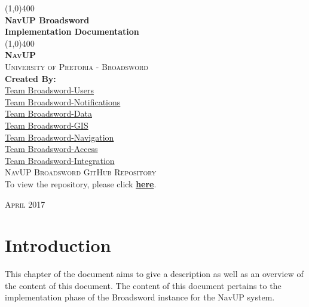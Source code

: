 \documentclass{article}
\begin{document}
	\begin{titlepage}
		\begin{center}

			\line(1,0){400}\\
			[6mm]
			\huge{
				\bfseries NavUP Broadsword\\
				\bfseries Implementation Documentation
			}\\
			[2mm]
			\line(1,0){400}\\
			[15mm]
			\textsc{\large{\textbf{NavUP}}}\\
			[4.5mm]
			\textsc{\large University of Pretoria - Broadsword}\\
			[20mm]
			\large{\textbf{Created By:}}\\
			[2mm]
			\large{
				\href{https://github.com/TheZimbo16/COS301-Broadsword-Users}{Team Broadsword-Users}\\
				\href{https://github.com/wanrick/bsword-notification}{Team Broadsword-Notifications}\\
				\href{https://github.com/lyle-univ/cos301-broadsword-data}{Team Broadsword-Data}\\
				\href{https://github.com/sjohandup/SE_BroadSword-GIS}{Team Broadsword-GIS}\\
				\href{https://github.com/AndriesJacobus/COS301Phase3BroadswordNavigation}{Team Broadsword-Navigation}\\
				\href{https://github.com/KeatonPennels/COS-301-Broadsword-Access}{Team Broadsword-Access}\\
				\href{https://github.com/Regan-Koopmans/NavUP-Broadsword}{Team Broadsword-Integration}
			}\\
			[30mm]
			
		\textsc{\Large NavUP Broadsword GitHub Repository}\\[2mm]
			To view the repository, please click 
		\href{https://github.com/Regan-Koopmans/NavUP-Broadsword}{\textbf{here}}. \\[35mm]
		\end{center}
		\begin{flushright}
			\textsc{\large April 2017}
		\end{flushright}
	\end{titlepage}

	\cleardoublepage
	\thispagestyle{empty}
	\tableofcontents
	\cleardoublepage

	\thispagestyle{empty}
	\listoffigures
	\cleardoublepage
	\setcounter{page}{1}
	
	\section{Introduction}\label{sec:intro}
		This chapter of the document aims to give a description as well as an overview of the content of this document. The content of this document pertains to the implementation phase of the Broadsword instance for the NavUP system.		
		
\end{document}
